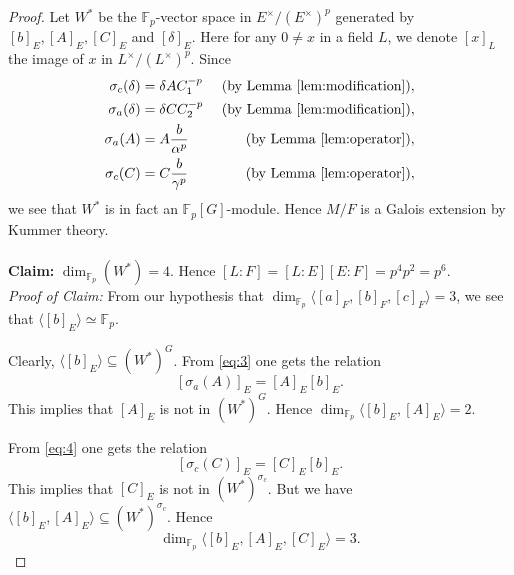 \documentclass[12pt,leqno]{amsart}
\theoremstyle{plain}
\theoremstyle{definition}
\newcommand{\F}{{\mathbb F}}
\begin{document}
\begin{proof}
Let $W^*$ be the $\F_p$-vector space in $E^\times/(E^\times)^p$ generated by $[b]_E,[A]_E,[C]_E$ and $[\delta]_E$. Here for any $0\not= x$ in a field $L$, we denote $[x]_L$ the image of $x$ in $L^\times/(L^\times)^p$. Since 
\begin{align}
\sigma_c(\delta)&= \delta A C_1^{-p} & \text{ (by Lemma~\ref{lem:modification})}, \label{eq:1}\\
\sigma_a(\delta)&=\delta C C_2^{-p} &\text{ (by Lemma~\ref{lem:modification})},\label{eq:2}\\
\sigma_a(A)&=A \frac{b}{\alpha^p} \label{eq:3} &\text{ (by Lemma~\ref{lem:operator})},\\
\sigma_c(C)&=C \frac{b}{\gamma^p} \label{eq:4} &\text{ (by Lemma~\ref{lem:operator})},
\end{align}
we see that $W^*$ is in fact an $\F_p[G]$-module. Hence $M/F$ is a Galois extension by Kummer theory.
\\
\\
{\bf Claim:} $\dim_{\F_p}(W^*)=4$. Hence $[L:F]=[L:E][E:F]=p^4p^2=p^6.$\\
{\it Proof of Claim:} From our hypothesis that $\dim_{\F_p}\langle [a]_F,[b]_F,[c]_F\rangle=3$, we see that $\langle [b]_E\rangle \simeq \F_p$. 

Clearly, $\langle[b]_E\rangle \subseteq (W^*)^G$.
From \eqref{eq:3} one gets the relation 
\[
[\sigma_a(A)]_E= [A]_E [b]_E.
\]
This implies that $[A]_E$  is not in $(W^*)^G$. Hence $\dim_{\F_p}\langle [b]_E,[A]_E\rangle=2$.

From \eqref{eq:4} one gets the relation 
\[  [\sigma_c(C)]_E= [C]_E [b]_E.
\]
This implies that $[C]_E$ is not in $(W^*)^{\sigma_c}$. But we have $\langle [b]_E,[A]_E\rangle\subseteq (W^*)^{\sigma_c}$. Hence
\[
\dim_{\F_p}\langle [b]_E,[A]_E,[C]_E\rangle =3.
\]


\end{proof}
\end{document}
